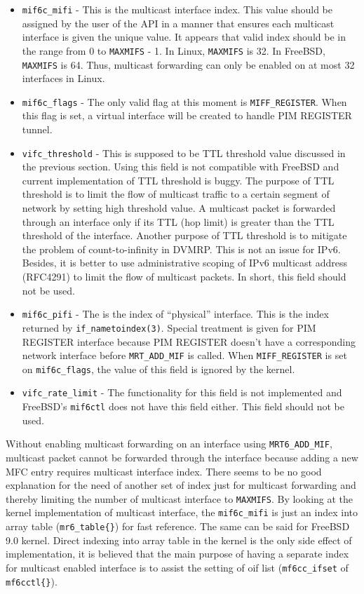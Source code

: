 \documentclass{article}
\begin{document}
\begin{itemize}
  \item \texttt{mif6c\_mifi} - This is the multicast interface index.  This
    value should be assigned by the user of the API in a manner that ensures
    each multicast interface is given the unique value. It appears that valid
    index should be in the range from 0 to \texttt{MAXMIFS} - 1. In Linux,
    \texttt{MAXMIFS} is 32. In FreeBSD, \texttt{MAXMIFS} is 64. Thus, multicast
    forwarding can only be enabled on at most 32 interfaces in Linux.
  \item \texttt{mif6c\_flags} - The only valid flag at this moment is
    \texttt{MIFF\_REGISTER}. When this flag is set, a virtual interface will be
    created to handle PIM REGISTER tunnel.
  \item \texttt{vifc\_threshold} - This is supposed to be TTL threshold value
    discussed in the previous section. Using this field is not compatible with
    FreeBSD and current implementation of TTL threshold is buggy. The purpose of
    TTL threshold is to limit the flow of multicast traffic to a certain segment
    of network by setting high threshold value. A multicast packet is forwarded
    through an interface only if its TTL (hop limit) is greater than the TTL
    threshold of the interface. Another purpose of TTL threshold is to mitigate
    the problem of count-to-infinity in DVMRP. This is not an issue for IPv6.
    Besides, it is better to use administrative scoping of IPv6 multicast
    address (RFC4291) to limit the flow of multicast packets. In short, this
    field should not be used.
  \item \texttt{mif6c\_pifi} - The is the index of ``physical'' interface. This
    is the index returned by \texttt{if\_nametoindex(3)}. Special treatment is
    given for PIM REGISTER interface because PIM REGISTER doesn't have a
    corresponding network interface before \texttt{MRT\_ADD\_MIF} is called.
    When \texttt{MIFF\_REGISTER} is set on \texttt{mif6c\_flags}, the value of
    this field is ignored by the kernel.
  \item \texttt{vifc\_rate\_limit} - The functionality for this field is not
    implemented and FreeBSD's \texttt{mif6ctl} does not have this field either.
    This field should not be used.
\end{itemize}

Without enabling multicast forwarding on an interface using
\texttt{MRT6\_ADD\_MIF}, multicast packet cannot be forwarded through the
interface because adding a new MFC entry requires multicast interface index.
There seems to be no good explanation for the need of another set of index just
for multicast forwarding and thereby limiting the number of multicast interface
to \texttt{MAXMIFS}. By looking at the kernel implementation of multicast
interface, the \texttt{mif6c\_mifi} is just an index into array table
(\texttt{mr6\_table\{\}}) for fast reference. The same can be said for FreeBSD
9.0 kernel. Direct indexing into array table in the kernel is the only side
effect of implementation, it is believed that the main purpose of having a
separate index for multicast enabled interface is to assist the setting of oif
list (\texttt{mf6cc\_ifset} of \texttt{mf6cctl\{\}}).
\end{document}
